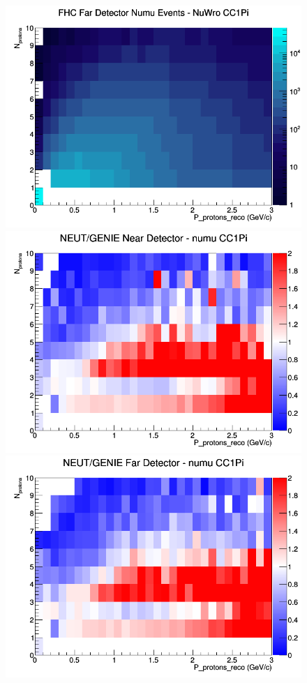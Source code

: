 \documentclass[12pt]{article}
\begin{document}
\begin{figure}[h]
\endminipage
{}
\includegraphics[width=\linewidth]{eff_N_P/LAr/protons/CC1Pi_FHC_FD_numu_N_P_NuWro.png}
\endminipage
\newline
{}
\includegraphics[width=\linewidth]{eff_N_P/LAr/protons/ratios/CC1Pi_NEUT_GENIE_numu_near_N_P.png}
\endminipage
{}
\includegraphics[width=\linewidth]{eff_N_P/LAr/protons/ratios/CC1Pi_NEUT_GENIE_numu_far_N_P.png}

\end{figure}
\end{document}
